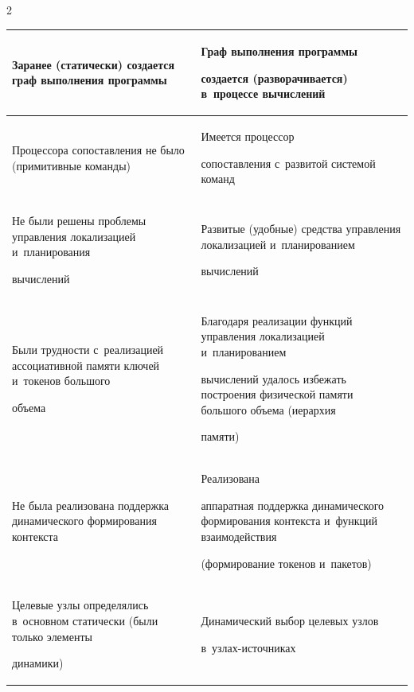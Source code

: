 \begin{multicols}{2}
\begin{table}
\begin{center}
\begin{tabular}{|p{67mm}|p{90mm}|}
Заранее (статически) создается граф выполнения программы&Граф выполнения программы 

создается (разворачивается) в~процессе вычислений\\

\hline

Процессора сопоставления не было (примитивные команды)&Имеется процессор 

сопоставления с~развитой системой команд\\

\hline

Не были решены проблемы управления локализацией и~планирования 

вычислений&Развитые (удобные) средства управления локализацией и~планированием 

вычислений\\

\hline

Были трудности с~реализацией ассоциативной памяти ключей и~токенов большого 

объема&Благодаря реализации функций управления локализацией и~планированием 

вычислений удалось избежать построения физической памяти большого объема (иерархия 

памяти)\\

\hline

Не была реализована поддержка динамического формирования контекста&Реализована 

аппаратная поддержка динамического формирования контекста и~функций взаимодействия 

(формирование токенов и~пакетов)\\

\hline

Целевые узлы определялись в~основном статически (были только элементы 

динамики)&Динамический выбор целевых узлов  

в~уз\-лах-ис\-точ\-никах\\

\hline

\end{tabular}

\end{center}

\vspace*{6pt}

\end{table}


\end{multicols}
